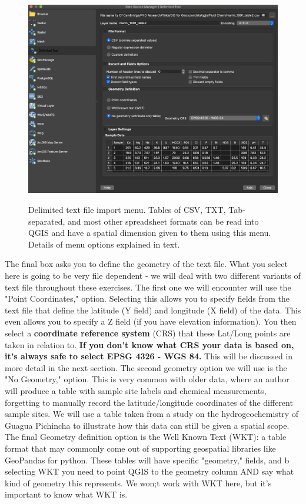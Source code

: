 \documentclass{article}
\begin{document}
\begin{figure}[htbp]
    \centering
    \includegraphics[width=\textwidth]{Fig_13_CSV_example.png}
    \label{fig13}
    \caption{Delimited text file import menu. Tables of CSV, TXT, Tab-separated, and most other spreadsheet formats can be read into QGIS and have a spatial dimension given to them using this menu. Details of menu options explained in text.}
\end{figure}

The final box asks you to define the geometry of the text file. What you select here is going to be very file dependent - we will deal with two different variants of text file throughout these exercises. The first one we will encounter will use the "Point Coordinates," option. Selecting this allows you to specify fields from the text file that define the latitude (Y field) and longitude (X field) of the data. This even allows you to specify a Z field (if you have elevation information). You then select a \textbf{coordinate reference system} (CRS) that these Lat/Long points are taken in relation to. \textbf{If you don't know what CRS your data is based on, it's always safe to select EPSG 4326 - WGS 84.} This will be discussed in more detail in the next section.  The second geometry option we will use is the "No Geometry," option. This is very common with older data, where an author will produce a table with sample site labels and chemical measurements, forgetting to manually record the latitude/longitude coordinates of the different sample sites.  We will use a table taken from a study on the hydrogeochemistry of Guagua Pichincha to illustrate how this data can still be given a spatial scope. The final Geometry definition option is the Well Known Text (WKT): a table format that may commonly come out of supporting geospatial libraries like GeoPandas for python. These tables will have specific "geometry," fields, and b selecting WKT you need to point QGIS to the geometry column AND say what kind of geometry this represents. We won;t work with WKT here, but it's important to know what WKT is. 
\end{document}
